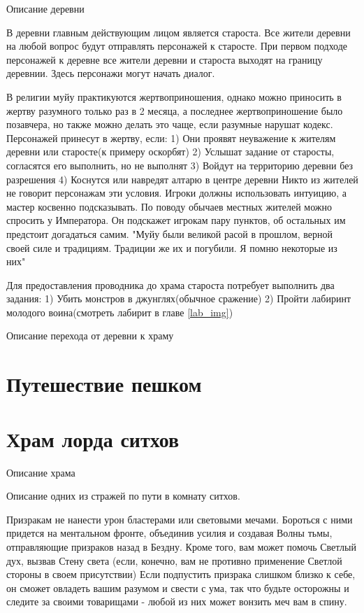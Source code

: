 \documentclass{article}
\begin{document}
Описание деревни
\begin{myquote}
\color{sw}

\end{myquote}
В деревни главным действующим лицом является староста. Все жители деревни на любой вопрос будут отправлять персонажей к старосте. При первом подходе персонажей к деревне все жители деревни и староста выходят на границу деревнии. Здесь персонажи могут начать диалог.

В религии муйу практикуются жертвоприношения, однако можно приносить в жертву разумного только раз в 2 месяца, а последнее жертвоприношение было позавчера, но также можно делать это чаще, если разумные нарушат кодекс.
Персонажей принесут в жертву, если:
1) Они проявят неуважение к жителям деревни или старосте(к примеру оскорбят)
2) Услышат задание от старосты, согласятся его выполнить, но не выполнят
3) Войдут на территорию деревни без разрешения
4) Коснутся или навредят алтарю в центре деревни
Никто из жителей не говорит персонажам эти условия. Игроки должны использовать интуицию, а мастер косвенно подсказывать.
По поводу обычаев местных жителей можно спросить у Императора. Он подскажет игрокам пару пунктов, об остальных им предстоит догадаться самим.
"Муйу были великой расой в прошлом, верной своей силе и традициям. Традиции же их и погубили. Я помню некоторые из них" 

Для предоставления проводника до храма староста потребует выполнить два задания:
1) Убить монстров в джунглях(обычное сражение)
2) Пройти лабиринт молодого воина(смотреть лабирит в главе \ref{lab_img})


Описание перехода от деревни к храму
\begin{myquote}
\color{sw}

\end{myquote}

\section{Путешествие пешком}


\section{Храм лорда ситхов}
Описание храма
\begin{myquote}
\color{sw}

\end{myquote}

Описание одних из стражей по пути в комнату ситхов.
\begin{myquote}
\color{sw}

\end{myquote}
Призракам не нанести урон бластерами или световыми мечами.
Бороться с ними придется на ментальном фронте, объединив усилия и создавая Волны тьмы, отправляющие призраков назад в Бездну.
Кроме того, вам может помочь Светлый дух, вызвав Стену света (если, конечно, вам не противно применение Светлой стороны в своем присутствии)
Если подпустить призрака слишком близко к себе, он сможет овладеть вашим разумом и свести с ума, так что будьте осторожны и следите за своими товарищами - любой из них может вонзить меч вам в спину.
\end{document}
